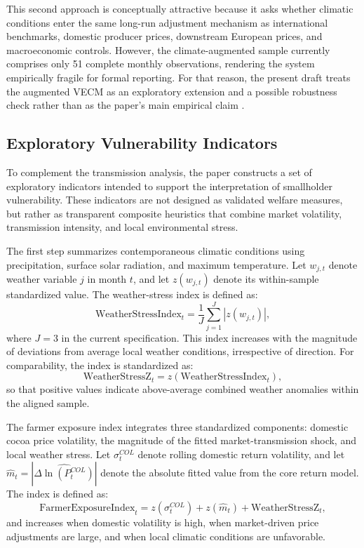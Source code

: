 \documentclass[11pt]{article}
\begin{document}
This second approach is conceptually attractive because it asks whether climatic conditions enter the same long-run adjustment mechanism as international benchmarks, domestic producer prices, downstream European prices, and macroeconomic controls. However, the climate-augmented sample currently comprises only 51 complete monthly observations, rendering the system empirically fragile for formal reporting. For that reason, the present draft treats the augmented VECM as an exploratory extension and a possible robustness check rather than as the paper's main empirical claim \citep{johansen_1991,hakkio_rush_1991}.

\subsection{Exploratory Vulnerability Indicators}

To complement the transmission analysis, the paper constructs a set of exploratory indicators intended to support the interpretation of smallholder vulnerability. These indicators are not designed as validated welfare measures, but rather as transparent composite heuristics that combine market volatility, transmission intensity, and local environmental stress.

The first step summarizes contemporaneous climatic conditions using precipitation, surface solar radiation, and maximum temperature. Let $w_{j,t}$ denote weather variable $j$ in month $t$, and let $z(w_{j,t})$ denote its within-sample standardized value. The weather-stress index is defined as:
\begin{equation}
\mathrm{WeatherStressIndex}_t = \frac{1}{J} \sum_{j=1}^{J} \left| z(w_{j,t}) \right|,
\label{eq:weather_stress_index}
\end{equation}
where $J=3$ in the current specification. This index increases with the magnitude of deviations from average local weather conditions, irrespective of direction. For comparability, the index is standardized as:
\begin{equation}
\mathrm{WeatherStressZ}_t = z(\mathrm{WeatherStressIndex}_t),
\label{eq:weather_stress_z}
\end{equation}
so that positive values indicate above-average combined weather anomalies within the aligned sample.

The farmer exposure index integrates three standardized components: domestic cocoa price volatility, the magnitude of the fitted market-transmission shock, and local weather stress. Let $\sigma^{COL}_t$ denote rolling domestic return volatility, and let $\widehat{m}_t = \left| \widehat{\Delta \ln(P^{COL}_{t})} \right|$ denote the absolute fitted value from the core return model. The index is defined as:
\begin{equation}
\mathrm{FarmerExposureIndex}_t = z(\sigma^{COL}_t) + z(\widehat{m}_t) + \mathrm{WeatherStressZ}_t,
\label{eq:farmer_exposure}
\end{equation}
and increases when domestic volatility is high, when market-driven price adjustments are large, and when local climatic conditions are unfavorable.
\end{document}
